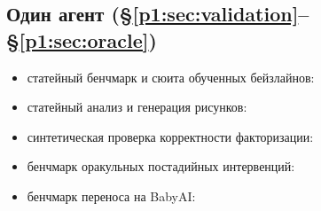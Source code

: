 \documentclass{article}
\begin{document}
\subsection*{Один агент (\S\ref{p1:sec:validation}--\S\ref{p1:sec:oracle})}
\begin{itemize}[leftmargin=16pt]
\item статейный бенчмарк и сюита обученных бейзлайнов: 
\item статейный анализ и генерация рисунков: 
\item синтетическая проверка корректности факторизации: 
\item бенчмарк оракульных постадийных интервенций: 
\item бенчмарк переноса на BabyAI: 
\end{itemize}
\end{document}

